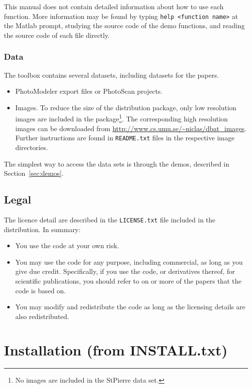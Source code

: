 \documentclass{article}
\begin{document}
This manual does not contain detailed information about how to use
each function. More information may be found by typing \texttt{help
  <function name>} at the Matlab prompt, studying the source code of
the demo functions, and reading the source code of each file directly.

\subsubsection{Data}

The toolbox contains several datasets, including datasets for the
\citet{Borlin2016:External,Murtiyoso2017:Reprocessing} papers.
\begin{itemize}
\item PhotoModeler export files or PhotoScan projects.
\item Images. To reduce the size of the distribution package, only low
  resolution images are included in the package\footnote{No images are
    included in the StPierre data set.}. The corresponding high
  resolution images can be downloaded from
  \url{http://www.cs.umu.se/~niclas/dbat_images}. Further instructions
  are found in \texttt{README.txt} files in the respective image
  directories.
\end{itemize}
The simplest way to access the data sets is through the demos,
described in Section~\ref{sec:demos}.

\subsection{Legal}

The licence detail are described in the \texttt{LICENSE.txt} file
included in the distribution. In summary:
\begin{itemize}
\item You use the code at your own risk.
\item You may use the code for any purpose, including commercial, as
  long as you give due credit. Specifically, if you use the code, or
  derivatives thereof, for scientific publications, you should refer
  to on or more of the papers
  \citet{Borlin2013:Bundle,Borlin2013:Experiments,Borlin2014:Camera,Borlin2016:External,Borlin2018:Modular}
  that the code is based on.
\item You may modify and redistribute the code as long as the
  licensing details are also redistributed.
\end{itemize}

\newpage
\section[Installation]{Installation (from INSTALL.txt)}
\label{sec:install}
\label{step:dbatInit}
\end{document}

